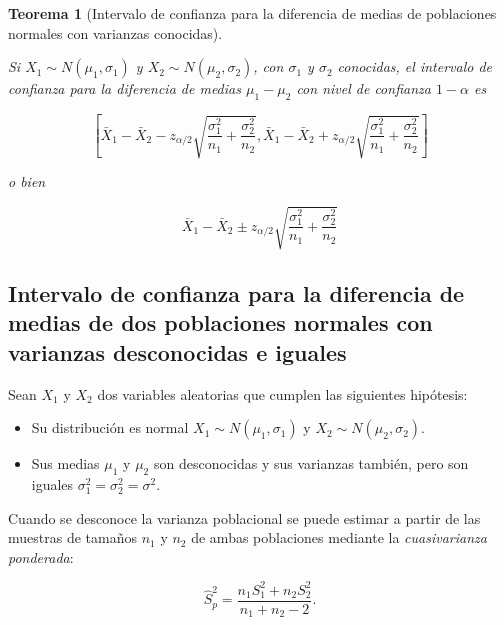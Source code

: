 \documentclass[
  a4paper,
]{scrreport}
\providecommand{\tightlist}{%
  \setlength{\itemsep}{0pt}\setlength{\parskip}{0pt}}\usepackage{longtable,booktabs,array}
\theoremstyle{plain}
\newtheorem{theorem}{Teorema}[chapter]
\theoremstyle{definition}
\theoremstyle{definition}
\theoremstyle{remark}
\begin{document}
\begin{theorem}[Intervalo de confianza para la diferencia de medias de
poblaciones normales con varianzas
conocidas]\protect\hypertarget{thm-intervalo-confianza-diferencia-medias-normales-varianzas-conocidas}{}\label{thm-intervalo-confianza-diferencia-medias-normales-varianzas-conocidas}

Si \(X_1\sim N(\mu_1,\sigma_1)\) y \(X_2\sim N(\mu_2,\sigma_2)\), con
\(\sigma_1\) y \(\sigma_2\) conocidas, el \emph{intervalo de confianza
para la diferencia de medias} \(\mu_1-\mu_2\) con nivel de confianza
\(1-\alpha\) es

\[
\left[\bar{X}_1-\bar{X}_2-z_{\alpha/2}\sqrt{\frac{\sigma^2_1}{n_1}+\frac{\sigma^2_2}{n_2}},\bar{X}_1-\bar{X}_2+z_{\alpha/2}\sqrt{\frac{\sigma^2_1}{n_1}+\frac{\sigma^2_2}{n_2}}\right]
\]

o bien

\[
\bar{X}_1-\bar{X}_2\pm z_{\alpha/2}\sqrt{\frac{\sigma^2_1}{n_1}+\frac{\sigma^2_2}{n_2}}
\]

\end{theorem}

\hypertarget{intervalo-de-confianza-para-la-diferencia-de-medias-de-dos-poblaciones-normales-con-varianzas-desconocidas-e-iguales}{%
\subsection{Intervalo de confianza para la diferencia de medias de dos
poblaciones normales con varianzas desconocidas e
iguales}\label{intervalo-de-confianza-para-la-diferencia-de-medias-de-dos-poblaciones-normales-con-varianzas-desconocidas-e-iguales}}

Sean \(X_1\) y \(X_2\) dos variables aleatorias que cumplen las
siguientes hipótesis:

\begin{itemize}
\tightlist
\item
  Su distribución es normal \(X_1\sim N(\mu_1,\sigma_1)\) y
  \(X_2\sim N(\mu_2,\sigma_2)\).
\item
  Sus medias \(\mu_1\) y \(\mu_2\) son desconocidas y sus varianzas
  también, pero son iguales \(\sigma^2_1=\sigma^2_2=\sigma^2\).
\end{itemize}

Cuando se desconoce la varianza poblacional se puede estimar a partir de
las muestras de tamaños \(n_1\) y \(n_2\) de ambas poblaciones mediante
la \emph{cuasivarianza ponderada}:

\[
\hat{S}^2_p = \frac{n_1S^2_1+n_2S^2_2}{n_1+n_2-2}.
\]
\end{document}
